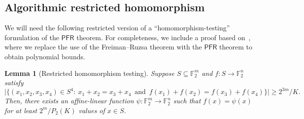 \documentclass[11pt]{amsart}
\newcommand{\F}{\mathbb{F}} %
\newcommand{\PFR}{\textsf{PFR}}
\theoremstyle{plain}
\newtheorem{lemma}[theorem]{Lemma}
\theoremstyle{definition}
\theoremstyle{remark}
\begin{document}
\subsection{Algorithmic restricted homomorphism}
We will need the following restricted version of a ``homomorphism-testing'' formulation of the $\PFR$ theorem.
For completeness, we include a proof based on~\cite[Proposition~2.6]{green_montreal}, where we replace the use of the Freiman--Ruzsa theorem with the $\PFR$ theorem to obtain polynomial bounds.

\begin{lemma}[Restricted homomorphism testing]
\label{lem:closeaffine}
Suppose $S\subseteq \F_2^m$ and $f: S \to \F_2^n$ satisfy
$$\big|\big\{(x_1, x_2, x_3, x_4)\in S^4:\: x_1+x_2 = x_3+x_4 \,\text{ and }\, f(x_1)+f(x_2) = f(x_3)+f(x_4)\big\}\big| \geq 2^{3m}/K.$$
Then, there exists an affine-linear function $\psi: \F_2^m \to \F_2^n$ such that $f(x) = \psi(x)$ for at least $2^m/P_2(K)$ values of $x\in S$.
\end{lemma}
\end{document}
